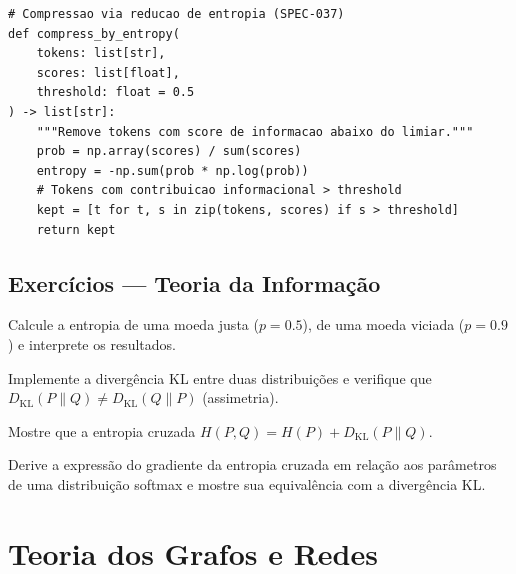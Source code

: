 \begin{lstlisting}[style=pythonstyle]
# Compressao via reducao de entropia (SPEC-037)
def compress_by_entropy(
    tokens: list[str],
    scores: list[float],
    threshold: float = 0.5
) -> list[str]:
    """Remove tokens com score de informacao abaixo do limiar."""
    prob = np.array(scores) / sum(scores)
    entropy = -np.sum(prob * np.log(prob))
    # Tokens com contribuicao informacional > threshold
    kept = [t for t, s in zip(tokens, scores) if s > threshold]
    return kept
\end{lstlisting}

\subsection{Exercícios — Teoria da Informação}

\begin{exercicio}
    Calcule a entropia de uma moeda justa ($p = 0.5$), de uma moeda viciada
    ($p = 0.9$) e interprete os resultados.
\end{exercicio}

\begin{exercicio}
    Implemente a divergência KL entre duas distribuições e verifique que
    $D_{\text{KL}}(P \parallel Q) \neq D_{\text{KL}}(Q \parallel P)$
    (assimetria).
\end{exercicio}

\begin{exercicio}
    Mostre que a entropia cruzada $H(P, Q) = H(P) + D_{\text{KL}}(P \parallel
    Q)$.
\end{exercicio}

\begin{exercicio}
    Derive a expressão do gradiente da entropia cruzada em relação aos
    parâmetros de uma distribuição softmax e mostre sua equivalência com a
    divergência KL.
\end{exercicio}

\section{Teoria dos Grafos e Redes}
\label{sec:teoria-grafos}
\nivelavancado

